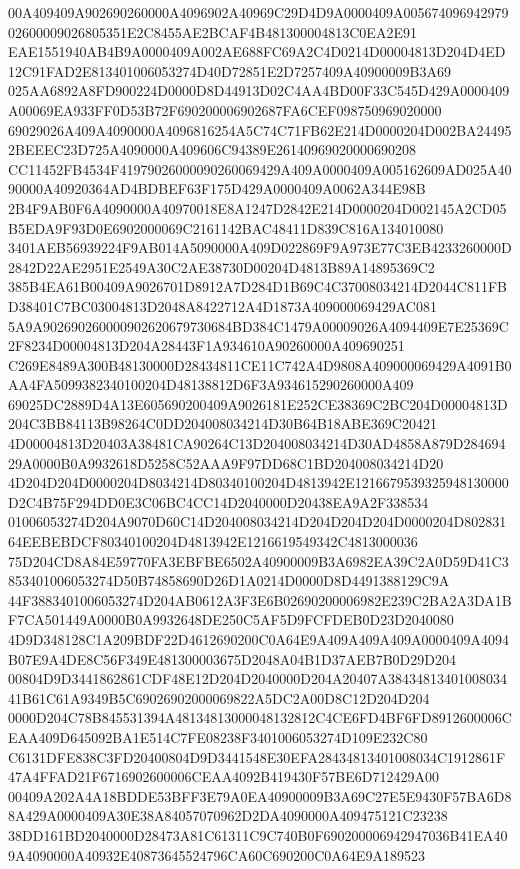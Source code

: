 \documentclass[UTF8,fontset=fandol,zihao=-4,a4paper]{ctexart}
\begin{document}
{{00A409409A902690260000A4096902A40969C29D4D9A0000409A00567409694297902600009026805351E2C8455AE2BCAF4B481300004813C0EA2E91
EAE1551940AB4B9A0000409A002AE688FC69A2C4D0214D00004813D204D4ED12C91FAD2E813401006053274D40D72851E2D7257409A40900009B3A69
025AA6892A8FD900224D0000D8D44913D02C4AA4BD00F33C545D429A0000409A00069EA933FF0D53B72F690200006902687FA6CEF098750969020000
69029026A409A4090000A4096816254A5C74C71FB62E214D0000204D002BA244952BEEEC23D725A4090000A409606C94389E26140969020000690208
CC11452FB4534F41979026000090260069429A409A0000409A005162609AD025A4090000A40920364AD4BDBEF63F175D429A0000409A0062A344E98B
2B4F9AB0F6A4090000A40970018E8A1247D2842E214D0000204D002145A2CD05B5EDA9F93D0E6902000069C2161142BAC48411D839C816A134010080
3401AEB56939224F9AB014A5090000A409D022869F9A973E77C3EB4233260000D2842D22AE2951E2549A30C2AE38730D00204D4813B89A14895369C2
385B4EA61B00409A9026701D8912A7D284D1B69C4C37008034214D2044C811FBD38401C7BC03004813D2048A8422712A4D1873A409000069429AC081
5A9A902690260000902620679730684BD384C1479A00009026A4094409E7E25369C2F8234D00004813D204A28443F1A934610A90260000A409690251
C269E8489A300B48130000D28434811CE11C742A4D9808A409000069429A4091B0AA4FA5099382340100204D48138812D6F3A934615290260000A409
69025DC2889D4A13E605690200409A9026181E252CE38369C2BC204D00004813D204C3BB84113B98264C0DD204008034214D30B64B18ABE369C20421
4D00004813D20403A38481CA90264C13D204008034214D30AD4858A879D28469429A0000B0A9932618D5258C52AAA9F97DD68C1BD204008034214D20
4D204D204D0000204D8034214D80340100204D4813942E1216679539325948130000D2C4B75F294DD0E3C06BC4CC14D2040000D20438EA9A2F338534
01006053274D204A9070D60C14D204008034214D204D204D204D0000204D80283164EEBEBDCF80340100204D4813942E1216619549342C4813000036
75D204CD8A84E59770FA3EBFBE6502A40900009B3A6982EA39C2A0D59D41C3853401006053274D50B74858690D26D1A0214D0000D8D4491388129C9A
44F3883401006053274D204AB0612A3F3E6B02690200006982E239C2BA2A3DA1BF7CA501449A0000B0A9932648DE250C5AF5D9FCFDEB0D23D2040080
4D9D348128C1A209BDF22D4612690200C0A64E9A409A409A409A0000409A4094B07E9A4DE8C56F349E481300003675D2048A04B1D37AEB7B0D29D204
00804D9D3441862861CDF48E12D204D2040000D204A20407A3843481340100803441B61C61A9349B5C69026902000069822A5DC2A00D8C12D204D204
0000D204C78B845531394A48134813000048132812C4CE6FD4BF6FD8912600006CEAA409D645092BA1E514C7FE08238F3401006053274D109E232C80
C6131DFE838C3FD20400804D9D3441548E30EFA28434813401008034C1912861F47A4FFAD21F6716902600006CEAA4092B419430F57BE6D712429A00
00409A202A4A18BDDE53BFF3E79A0EA40900009B3A69C27E5E9430F57BA6D88A429A0000409A30E38A84057070962D2DA4090000A409475121C23238
38DD161BD2040000D28473A81C61311C9C740B0F690200006942947036B41EA409A4090000A40932E40873645524796CA60C690200C0A64E9A189523
}}
\end{document}
